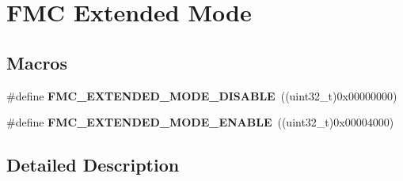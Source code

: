\hypertarget{group___f_m_c___extended___mode}{}\section{F\+MC Extended Mode}
\label{group___f_m_c___extended___mode}
\subsection*{Macros}
\begin{DoxyCompactItemize}
\item 
\#define {\bfseries F\+M\+C\+\_\+\+E\+X\+T\+E\+N\+D\+E\+D\+\_\+\+M\+O\+D\+E\+\_\+\+D\+I\+S\+A\+B\+LE}~((uint32\+\_\+t)0x00000000)\hypertarget{group___f_m_c___extended___mode_ga68365a3a44310b097eaa8e81fa38fa8d}{}\label{group___f_m_c___extended___mode_ga68365a3a44310b097eaa8e81fa38fa8d}

\item 
\#define {\bfseries F\+M\+C\+\_\+\+E\+X\+T\+E\+N\+D\+E\+D\+\_\+\+M\+O\+D\+E\+\_\+\+E\+N\+A\+B\+LE}~((uint32\+\_\+t)0x00004000)\hypertarget{group___f_m_c___extended___mode_ga9239a72c8a1a58ee12189743905b8e29}{}\label{group___f_m_c___extended___mode_ga9239a72c8a1a58ee12189743905b8e29}

\end{DoxyCompactItemize}


\subsection{Detailed Description}
